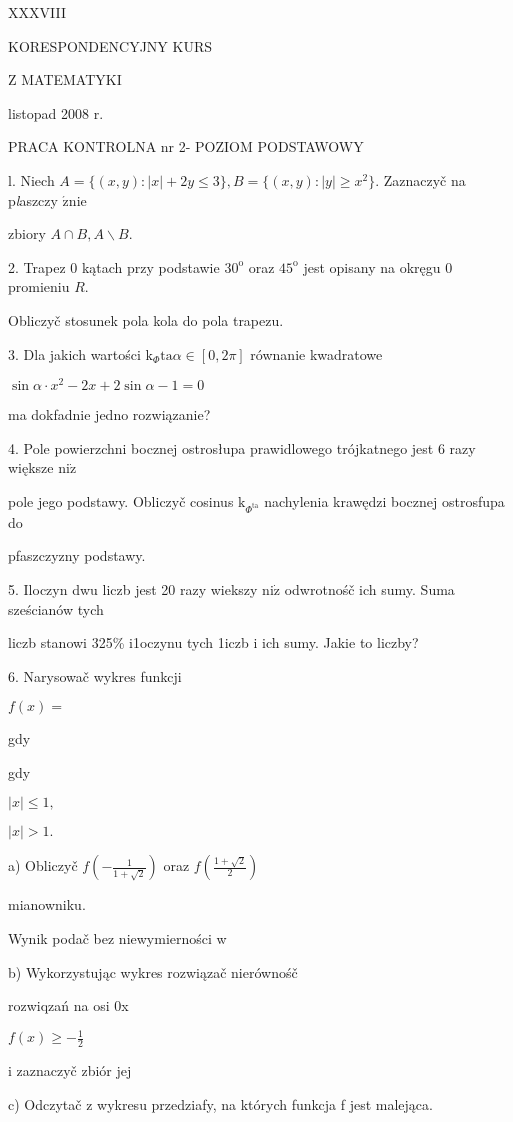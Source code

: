 \documentclass[a4paper,12pt]{article}
\begin{document}
XXXVIII

KORESPONDENCYJNY KURS

Z MATEMATYKI

listopad 2008 r.

PRACA KONTROLNA nr 2- POZIOM PODSTAWOWY

l. Niech $A=\{(x,y):|x|+2y\leq 3\}, B=\{(x,y):|y|\geq x^{2}\}$. Zaznaczyč na p{\it l}aszczy $\acute{\mathrm{z}}\mathrm{n}\mathrm{i}\mathrm{e}$

zbiory $A\cap B, A\backslash B.$

2. Trapez $0$ kątach przy podstawie $30^{\mathrm{o}}$ oraz $45^{\mathrm{o}}$ jest opisany na okręgu $0$ promieniu $R.$

Obliczyč stosunek pola kola do pola trapezu.

3. Dla jakich wartości $\mathrm{k}_{\Phi}\mathrm{t}\mathrm{a}\alpha\in[0,2\pi]$ równanie kwadratowe

$\sin\alpha\cdot x^{2}-2x+2\sin\alpha-1=0$

ma dokfadnie jedno rozwiązanie?

4. Pole powierzchni bocznej ostrosłupa prawidlowego trójkatnego jest 6 razy większe $\mathrm{n}\mathrm{i}\dot{\mathrm{z}}$

pole jego podstawy. Obliczyč cosinus $\mathrm{k}_{\Phi^{\mathrm{t}\mathrm{a}}}$ nachylenia krawędzi bocznej ostrosfupa do

pfaszczyzny podstawy.

5. Iloczyn dwu liczb jest 20 razy wiekszy $\mathrm{n}\mathrm{i}\dot{\mathrm{z}}$ odwrotnośč ich sumy. Suma sześcianów tych

liczb stanowi 325\% i1oczynu tych 1iczb $\mathrm{i}$ ich sumy. Jakie to liczby?

6. Narysowač wykres funkcji

$f(x)=$

gdy

gdy

$|x|\leq 1,$

$|x|>1.$

a) Obliczyč $f(-\displaystyle \frac{1}{1+\sqrt{2}})$ oraz $f(\displaystyle \frac{1+\sqrt{2}}{2})$

mianowniku.

Wynik podač bez niewymierności w

b) Wykorzystując wykres rozwiązač nierównośč

rozwiqzań na osi 0x

$f(x) \geq -\displaystyle \frac{1}{2}$

i zaznaczyč zbiór jej

c) Odczytač z wykresu przedziafy, na których funkcja f jest malejąca.
\end{document}
